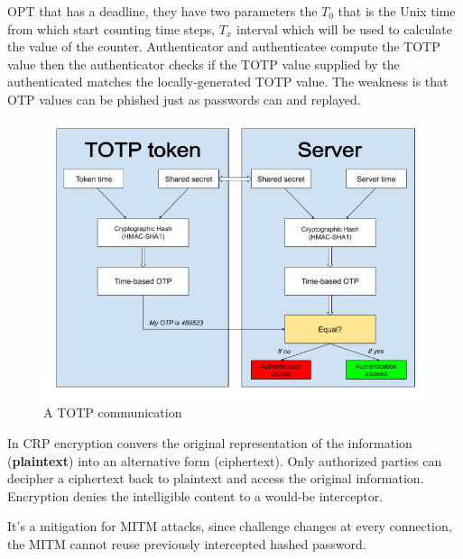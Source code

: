     OPT that has a deadline, they have two parameters the $T_0$ that is the Unix time from which start counting time steps, $T_x$ interval which will be used to calculate the value of the counter. Authenticator and authenticatee compute the TOTP value then the authenticator checks if the TOTP value supplied by the authenticated matches the locally-generated TOTP value. The weakness is that OTP values can be phished just as passwords can and replayed.
    \begin{figure}[h!]
        \centering
        \includegraphics[scale=0.35]{images/TOTP.png}
        \caption{A TOTP communication}
        \label{fig:TOTP}
    \end{figure}
    
    \FloatBarrier   
    
    In CRP encryption convers the original representation of the information (\textbf{plaintext}) into an alternative form (ciphertext). Only authorized parties can decipher a ciphertext back to plaintext and access the original information. Encryption denies the intelligible content to a would-be interceptor.
    
    It's a mitigation for MITM attacks, since challenge changes at every connection, the MITM cannot reuse previously intercepted hashed password.
    

